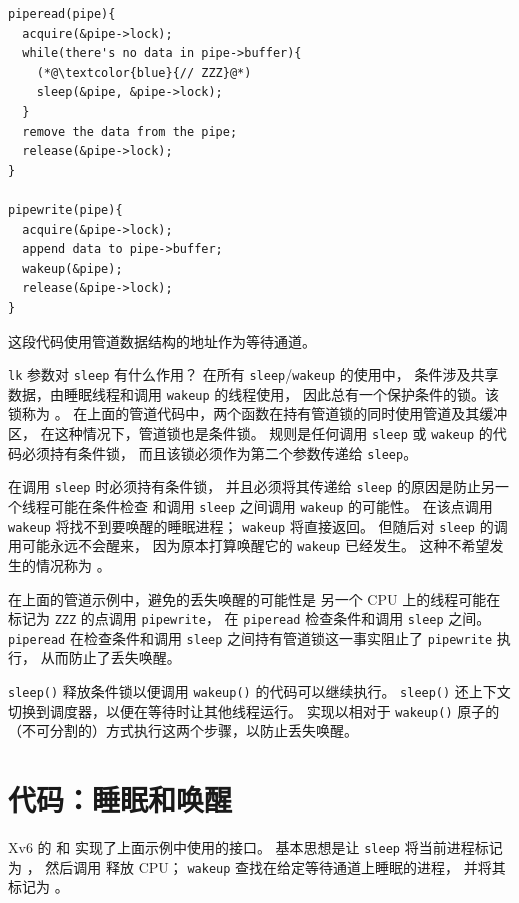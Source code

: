 \begin{lstlisting}
piperead(pipe){
  acquire(&pipe->lock);
  while(there's no data in pipe->buffer){
    (*@\textcolor{blue}{// ZZZ}@*)
    sleep(&pipe, &pipe->lock);
  }
  remove the data from the pipe;
  release(&pipe->lock);
}

pipewrite(pipe){
  acquire(&pipe->lock);
  append data to pipe->buffer;
  wakeup(&pipe);
  release(&pipe->lock);
}
\end{lstlisting}

这段代码使用管道数据结构的地址作为等待通道。

\lstinline{lk} 参数对 \lstinline{sleep} 有什么作用？
在所有 \lstinline{sleep}/\lstinline{wakeup} 的使用中，
条件涉及共享数据，由睡眠线程和调用 \lstinline{wakeup} 的线程使用，
因此总有一个保护条件的锁。该锁称为 。
在上面的管道代码中，两个函数在持有管道锁的同时使用管道及其缓冲区，
在这种情况下，管道锁也是条件锁。
规则是任何调用 \lstinline{sleep} 或 \lstinline{wakeup} 的代码必须持有条件锁，
而且该锁必须作为第二个参数传递给 \lstinline{sleep}。

在调用 \lstinline{sleep} 时必须持有条件锁，
并且必须将其传递给 \lstinline{sleep} 的原因是防止另一个线程可能在条件检查
和调用 \lstinline{sleep} 之间调用 \lstinline{wakeup} 的可能性。
在该点调用 \lstinline{wakeup} 将找不到要唤醒的睡眠进程；
\lstinline{wakeup} 将直接返回。
但随后对 \lstinline{sleep} 的调用可能永远不会醒来，
因为原本打算唤醒它的 \lstinline{wakeup} 已经发生。
这种不希望发生的情况称为 。

在上面的管道示例中，避免的丢失唤醒的可能性是
另一个 CPU 上的线程可能在标记为 {\tt ZZZ} 的点调用 \lstinline{pipewrite}，
在 \lstinline{piperead} 检查条件和调用 \lstinline{sleep} 之间。
\lstinline{piperead} 在检查条件和调用 \lstinline{sleep} 之间持有管道锁这一事实阻止了 \lstinline{pipewrite} 执行，
从而防止了丢失唤醒。

{\tt sleep()} 释放条件锁以便调用 {\tt wakeup()} 的代码可以继续执行。
{\tt sleep()} 还上下文切换到调度器，以便在等待时让其他线程运行。
实现以相对于 {\tt wakeup()} 原子的（不可分割的）方式执行这两个步骤，以防止丢失唤醒。

\section{代码：睡眠和唤醒}

Xv6 的
和
实现了上面示例中使用的接口。
基本思想是让
\lstinline{sleep}
将当前进程标记为
，
然后调用
释放 CPU；
\lstinline{wakeup}
查找在给定等待通道上睡眠的进程，
并将其标记为
。

